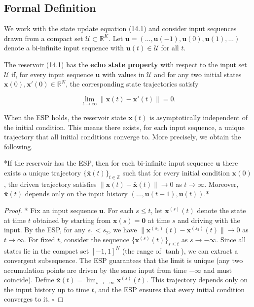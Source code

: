\subsection{Formal Definition}\label{sec:14.2.1}

We work with the state update equation (14.1) and consider input sequences drawn from a compact set $\mathcal{U} \subset \mathbb{R}^K$. Let $\mathbf{u} = (\ldots, \mathbf{u}(-1), \mathbf{u}(0), \mathbf{u}(1), \ldots)$ denote a bi-infinite input sequence with $\mathbf{u}(t) \in \mathcal{U}$ for all $t$.

\begin{definition}\label{def:14.1}
The reservoir (14.1) has the \textbf{echo state property} with respect to the input set $\mathcal{U}$ if, for every input sequence $\mathbf{u}$ with values in $\mathcal{U}$ and for any two initial states $\mathbf{x}(0), \mathbf{x}'(0) \in \mathbb{R}^N$, the corresponding state trajectories satisfy

\begin{equation}\label{eq:14.3}\tag{14.3}
\lim_{t \to \infty} \|\mathbf{x}(t) - \mathbf{x}'(t)\| = 0.
\end{equation}

When the ESP holds, the reservoir state $\mathbf{x}(t)$ is asymptotically independent of the initial condition. This means there exists, for each input sequence, a unique trajectory that all initial conditions converge to. More precisely, we obtain the following.
\end{definition}


\begin{proposition}\label{prop:14.1.}
*If the reservoir has the ESP, then for each bi-infinite input sequence $\mathbf{u}$ there exists a unique trajectory $\{\bar{\mathbf{x}}(t)\}_{t \in \mathbb{Z}}$ such that for every initial condition $\mathbf{x}(0)$, the driven trajectory satisfies $\|\mathbf{x}(t) - \bar{\mathbf{x}}(t)\| \to 0$ as $t \to \infty$. Moreover, $\bar{\mathbf{x}}(t)$ depends only on the input history $(\ldots, \mathbf{u}(t-1), \mathbf{u}(t))$.*
\end{proposition}


\begin{proof}
* Fix an input sequence $\mathbf{u}$. For each $s \leq t$, let $\mathbf{x}^{(s)}(t)$ denote the state at time $t$ obtained by starting from $\mathbf{x}(s) = \mathbf{0}$ at time $s$ and driving with the input. By the ESP, for any $s_1 < s_2$, we have $\|\mathbf{x}^{(s_1)}(t) - \mathbf{x}^{(s_2)}(t)\| \to 0$ as $t \to \infty$. For fixed $t$, consider the sequence $\{\mathbf{x}^{(s)}(t)\}_{s \leq t}$ as $s \to -\infty$. Since all states lie in the compact set $[-1, 1]^N$ (the range of $\tanh$), we can extract a convergent subsequence. The ESP guarantees that the limit is unique (any two accumulation points are driven by the same input from time $-\infty$ and must coincide). Define $\bar{\mathbf{x}}(t) = \lim_{s \to -\infty} \mathbf{x}^{(s)}(t)$. This trajectory depends only on the input history up to time $t$, and the ESP ensures that every initial condition converges to it. $\square$

\end{proof}

